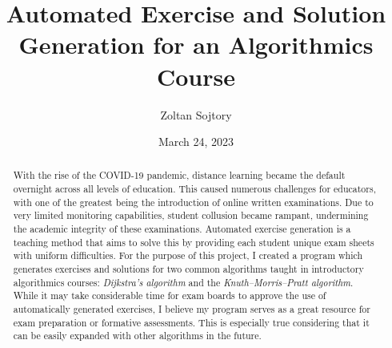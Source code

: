 \documentclass{l4proj}
\begin{document}
\title{Automated Exercise and Solution Generation for an Algorithmics Course}
\author{Zoltan Sojtory}
\date{March 24, 2023}

\maketitle

\begin{abstract}
	With the rise of the COVID-19 pandemic, distance learning became the default overnight across all levels of education. This caused numerous challenges for educators, with one of the greatest being the introduction of online written examinations. Due to very limited monitoring capabilities, student collusion became rampant, undermining the academic integrity of these examinations. Automated exercise generation is a teaching method that aims to solve this by providing each student unique exam sheets with uniform difficulties. For the purpose of this project, I created a program which generates exercises and solutions for two common algorithms taught in introductory algorithmics courses: \textit{Dijkstra's algorithm} and the \textit{Knuth–Morris–Pratt algorithm}. While it may take considerable time for exam boards to approve the use of automatically generated exercises, I believe my program serves as a great resource for exam preparation or formative assessments. This is especially true considering that it can be easily expanded with other algorithms in the future.
\end{abstract}


%
%
%
\educationalconsent


\tableofcontents
\end{document}
